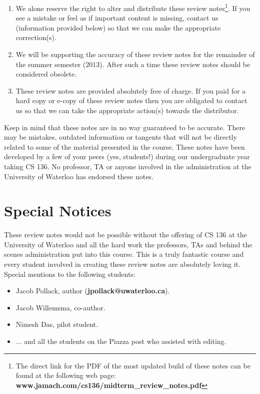 \documentclass[11pt, twoside, exarticle]{article}
\begin{document}
\begin{enumerate}

\item We alone reserve the right to alter and distribute these review notes\footnote{The direct link for the PDF of the most updated build of these notes can be found at the following web page: \textbf{www.jamach.com/cs136/midterm\_review\_notes.pdf}}. If you see a mistake or feel as if important content is missing, contact us (information provided below) so that we can make the appropriate correction(s).

\item We will be supporting the accuracy of these review notes for the remainder of the summer semester (2013). After such a time these review notes should be considered obsolete.

\item These review notes are provided absolutely free of charge. If you paid for a hard copy or e-copy of these review notes then you are obligated to contact us so that we can take the appropriate action(s) towards the distributor.

\end{enumerate}

Keep in mind that these notes are in no way guaranteed to be accurate. There may be mistakes, outdated information or tangents that will not be directly related to some of the material presented in the course. These notes have been developed by a few of your peers (yes, students!) during our undergraduate year taking CS 136. No professor, TA or anyone involved in the administration at the University of Waterloo has endorsed these notes.

\section*{Special Notices}

These review notes would not be possible without the offering of CS 136 at the University of Waterloo and all the hard work the professors, TAs and behind the scenes administration put into this course. This is a truly fantastic course and every student involved in creating these review notes are absolutely loving it. Special mentions to the following students:

\begin{itemize}

\item Jacob Pollack, author (\textbf{jpollack@uwaterloo.ca}).
\item Jacob Willemsma, co-author.
\item Nimesh Das, pilot student.
\item ... and all the students on the Piazza post who assisted with editing.

\end{itemize}
\end{document}
